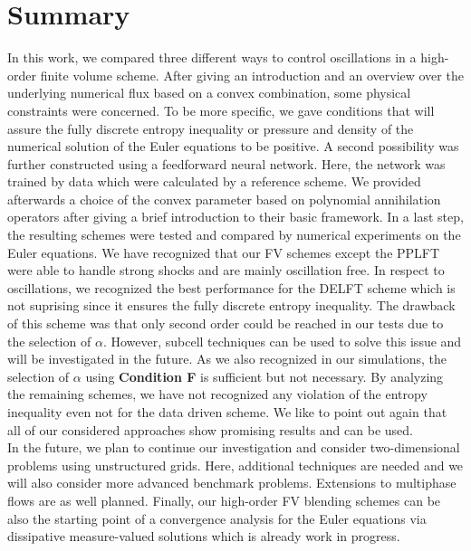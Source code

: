 \section{Summary}\label{se_summary}

In this work, we compared three different ways to control oscillations in a high-order finite volume scheme. After giving an introduction and an overview over the underlying numerical flux based on a convex combination, some physical constraints were concerned. To be more specific, we gave conditions that will assure the fully discrete entropy inequality or  pressure and density of the numerical solution of the Euler equations to be positive. A second possibility was further constructed using a feedforward neural network. Here, the network was trained by data which were calculated by a reference scheme. We provided afterwards a choice of the convex parameter based on polynomial annihilation operators after giving a brief introduction to their basic framework. In a last step, the resulting schemes were tested and compared by numerical experiments on the Euler equations. 
We have recognized that  our FV schemes except the PPLFT  were able to handle 
strong shocks and are mainly oscillation free. In respect to oscillations, we recognized the best performance for the DELFT scheme which is not suprising since it ensures the fully discrete entropy inequality. The drawback of this scheme was that only second order could be reached in our tests due to the selection of $\alpha$. However, subcell techniques can be used to solve this issue and will be investigated in the future. 
As we also recognized in our simulations, the selection of $\alpha$ using \textbf{Condition F} is sufficient but not necessary. By analyzing the remaining schemes, we have not recognized any violation of the entropy inequality even not for the data driven scheme.  We like to point out again that all of our considered approaches show promising results and can be used. \\
In the future, we plan to continue our investigation and consider two-dimensional problems using unstructured grids. Here, additional techniques are needed and we will also consider more advanced benchmark problems.  Extensions to multiphase flows are as well planned. 
Finally, our high-order FV blending schemes can be also the starting point of a convergence analysis for the Euler equations via dissipative measure-valued solutions  \cite{feireisl2019convergence, lukavcova2022convergence} which is already work in progress.